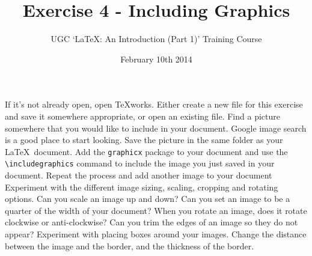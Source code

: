 \documentclass[11pt]{exam}
\title{Exercise 4 - Including Graphics}
\author{UGC `\LaTeX: An Introduction (Part 1)' Training Course}
\date{February 10th 2014}
\begin{document}
\maketitle


\vspace{0.2in}

\begin{questions}

\question
If it's not already open, open TeXworks. Either create a new file for this exercise and save it somewhere appropriate, or open an existing file.
\question
Find a picture somewhere that you would like to include in your document. Google image search is a good place to start looking.
\question
Save the picture in the same folder as your \LaTeX\ document.
\question
Add the \texttt{graphicx} package to your document and use the \texttt{{\textbackslash}includegraphics} command to include the image you just saved in your document.
\question
Repeat the process and add another image to your document
\question
Experiment with the different image sizing, scaling, cropping and rotating options. Can you scale an image up and down? Can you set an image to be a quarter of the width of your document? When you rotate an image, does it rotate clockwise or anti-clockwise? Can you trim the edges of an image so they do not appear?
\question
Experiment with placing boxes around your images. Change the distance between the image and the border, and the thickness of the border.
\end{questions}
\end{document}
